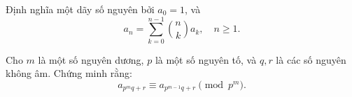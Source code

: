 \ifshowproblem
\begin{problem}\label{example:ROU-2015-TST-D5-P3}
    Định nghĩa một dãy số nguyên bởi \( a_0 = 1 \), và 
    \[
        a_n = \sum_{k=0}^{n-1} \binom{n}{k} a_k, \quad n \geq 1.
    \]

    Cho \( m \) là một số nguyên dương, \( p \) là một số nguyên tố, và \( q, r \) là các số nguyên không âm.  
    Chứng minh rằng:
    \[
        a_{p^m q + r} \equiv a_{p^{m-1} q + r} \pmod{p^m}.
    \]
\end{problem}
\fi

\footnotemark
{}
\fi